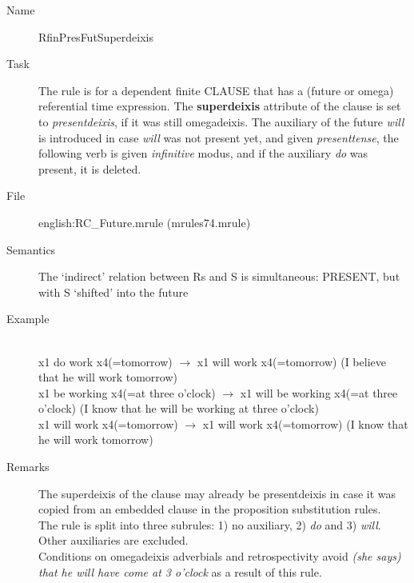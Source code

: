 \begin{description}
\vspace{1 cm}
\begin{description}
\item[Name]   RfinPresFutSuperdeixis
\item[Task] The rule is for a dependent finite CLAUSE that has a 
(future or omega) referential time expression. 
The {\bf superdeixis} attribute of the clause is set to {\em presentdeixis\/}, 
if it was still omegadeixis.
The auxiliary of the future {\em will\/} is introduced in case {\em will\/} was 
not present yet, and given {\em 
presenttense\/}, the following verb is given {\em infinitive\/} modus, 
and if the auxiliary {\em do\/} was present, it is deleted. 
\item[File] english:RC\_Future.mrule (mrules74.mrule)
\item[Semantics] The `indirect' relation between Rs and S is simultaneous: PRESENT, but 
with S `shifted' into the future
\item[Example] \mbox{}\\
x1 do work x4(=tomorrow) $\rightarrow$ x1 will work x4(=tomorrow) (I believe 
that he will work tomorrow)\\
x1 be working x4(=at three o'clock) $\rightarrow$ x1 will be working x4(=at 
three o'clock) (I know that he will be working at three o'clock)\\
x1 will work x4(=tomorrow) $\rightarrow$ x1 will work x4(=tomorrow) 
(I know that he will work tomorrow)
\item[Remarks] 
The superdeixis of the clause may already be  presentdeixis in 
case it was copied from an embedded  clause in the proposition substitution 
rules. \\
The rule is split into three subrules: 1) no auxiliary, 2) {\em do} and 3) {\em 
will}. Other auxiliaries are excluded.\\
Conditions on omegadeixis adverbials and retrospectivity avoid {\em (she says) 
that he will have come at 3 o'clock} as a result of this rule.
\end{description}


\end{description}
